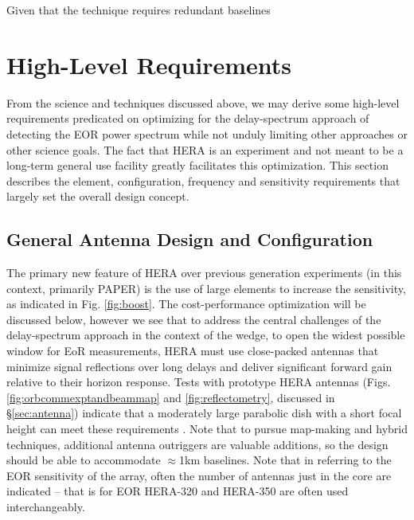 \documentclass[preprint,11pt]{aastex}
\begin{document}
Given that the technique requires redundant baselines

\section{High-Level Requirements} 
\label{sec:requirements}
From the science and techniques discussed above, we may derive some high-level requirements predicated on optimizing for the delay-spectrum approach of detecting the EOR power spectrum while not unduly limiting other approaches or other science goals.  The fact that HERA is an experiment and not meant to be a long-term general use facility greatly facilitates this optimization. This section describes the element, configuration, frequency and sensitivity requirements that largely set the overall design concept.

\subsection{General Antenna Design and Configuration}
The primary new feature of HERA over previous generation experiments (in this context, primarily PAPER) is the use of large elements to increase the sensitivity, as indicated in Fig. \ref{fig:boost}.  The cost-performance optimization will 
be discussed below, however we see that to address the central challenges of the delay-spectrum approach in the context of the wedge, to open the widest possible window for EoR measurements, 
HERA must use close-packed antennas that
minimize signal reflections over long delays and deliver significant forward gain relative to their horizon response.
Tests with prototype HERA antennas (Figs. \ref{fig:orbcommexptandbeammap} and \ref{fig:reflectometry}, discussed in \S\ref{sec:antenna})
indicate that a moderately large parabolic dish with a short focal height can meet these requirements
\citep{ewall-wice_et_al2016-EoXLimits,neben_et_al2016,thyagarajan_et_al2016}.  Note that to pursue map-making and hybrid techniques, additional antenna outriggers are valuable additions, so the design
should be able to accommodate $\approx$1km baselines.  Note that in referring to the EOR sensitivity of the array, often the number of antennas just in the core are
indicated -- that is for EOR HERA-320 and HERA-350 are often used interchangeably.
\end{document}
